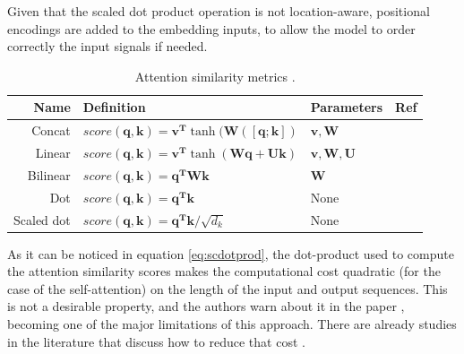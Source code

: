 Given that the scaled dot product operation is not location-aware, positional encodings are added to the embedding inputs, to allow the model to order correctly the input signals if needed.

\begin{table}
\caption{Attention similarity metrics \autocite{uday2019}.}
\footnotesize
\centering
\begin{tabular}{r|lll}
	\toprule
	                        Name & Definition                                                                                        & Parameters                           & Ref                     \\ \midrule
	           Concat & $score(\mathbf{q}, \mathbf{k}) = \mathbf{v^T} \tanh(\mathbf{W}([\mathbf{q};\mathbf{k}])$          & $\mathbf{v}, \mathbf{W}$             & \autocite{Luong2015}    \\
	           Linear  & $score(\mathbf{q}, \mathbf{k}) = \mathbf{v^T} \tanh(\mathbf{W}\mathbf{q} + \mathbf{U}\mathbf{k})$ & $\mathbf{v}, \mathbf{W}, \mathbf{U}$ & \autocite{bahdanau2015} \\
	   Bilinear & $score(\mathbf{q}, \mathbf{k}) =  \mathbf{q^T} \mathbf{W} \mathbf{k}$                             & $\mathbf{W}$                         & \autocite{Luong2015}    \\
	       Dot & $score(\mathbf{q}, \mathbf{k}) = \mathbf{q^T}  \mathbf{k}$                                        & None                                 & \autocite{vaswani2017}  \\
	Scaled dot   & $score(\mathbf{q}, \mathbf{k}) =  \mathbf{q^T} \mathbf{k} / \sqrt{d_k}$                           & None                                 & \autocite{Luong2015}    \\ \bottomrule
\end{tabular}
\label{table:attentionsimilarities}
\end{table}

As it can be noticed in equation \ref{eq:scdotprod}, the dot-product used to compute the attention similarity scores makes the computational cost quadratic (for the case of the self-attention) on the length of the input and output sequences. This is not a desirable property, and the authors warn about it in the paper \autocite{vaswani2017}, becoming one of the major limitations of this approach. There are already studies in the literature that discuss how to reduce that cost \autocite{jaegle2021, so2021}.

